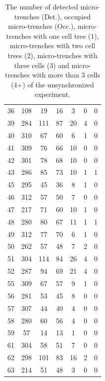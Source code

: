 \documentclass[pdftex,12pt,a4paper]{report}
\begin{document}
\begin{appendices}
\begin{table}[H]
\begin{tabular}[t]{ c | c | c | c | c | c | c }
\\
36 & 108 & 19 & 16 & 3 & 0 & 0
\\
39 & 284 & 111 & 87 & 20 & 4 & 0
\\
40 & 310 & 67 & 60 & 6 & 1 & 0
\\
41 & 309 & 76 & 66 & 10 & 0 & 0
\\
42 & 301 & 78 & 68 & 10 & 0 & 0
\\
43 & 286 & 85 & 73 & 10 & 1 & 1
\\
45 & 295 & 45 & 36 & 8 & 1 & 0
\\
46 & 312 & 57 & 50 & 7 & 0 & 0
\\
47 & 217 & 71 & 60 & 10 & 1 & 0
\\
48 & 280 & 80 & 67 & 11 & 1 & 1
\\
49 & 312 & 77 & 70 & 6 & 1 & 0
\\
50 & 262 & 57 & 48 & 7 & 2 & 0
\\
51 & 304 & 114 & 84 & 26 & 4 & 0
\\
52 & 287 & 94 & 69 & 21 & 4 & 0
\\
55 & 309 & 67 & 57 & 9 & 1 & 0
\\
56 & 281 & 53 & 45 & 8 & 0 & 0
\\
57 & 307 & 44 & 40 & 4 & 0 & 0
\\
58 & 280 & 60 & 56 & 4 & 0 & 0
\\
59 & 57 & 14 & 13 & 1 & 0 & 0
\\
61 & 304 & 58 & 51 & 7 & 0 & 0
\\
62 & 298 & 101 & 83 & 16 & 2 & 0
\\
63 & 214 & 51 & 48 & 3 & 0 & 0
\\
\hline
\end{tabular}
\caption[The occupancy statistics of the unsynchronized experiment]{The number of detected micro-trenches (Det.), occupied micro-trenches (Occ.), micro-trenches with one cell tree (1), micro-trenches with two cell trees (2), micro-trenches with three cells (3) and micro-trenches with more than 3 cells (4+) of the unsynchronized experiment.}
\label{table:occupancy_statistics_unsyn}
\end{table}

\newpage


\end{appendices}
\end{document}
